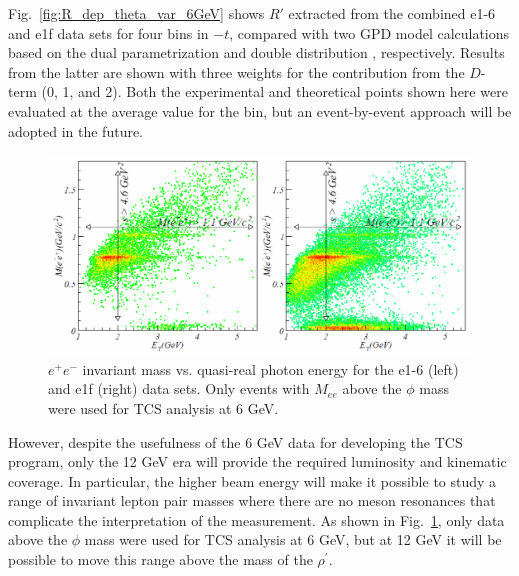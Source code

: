 Fig.~\ref{fig:R_dep_theta_var_6GeV} shows $R'$ extracted from the combined
e1-6 and e1f data sets for four bins in $-t$, compared with two GPD model
calculations based on the dual parametrization
\cite{Polyakov:2002wz,Guzey:2006xi,Guzey:2008ys,Polyakov:2008aa} and double
distribution \cite{Radyushkin:1998es}, respectively. Results from the latter
are shown with three weights for the contribution from the $D$-term (0, 1, and
2). Both the experimental and theoretical points shown here were evaluated at
the average value for the bin, but an event-by-event approach will be adopted
in the future.

\begin{figure}[t]
\includegraphics[scale=0.45]{TCS407.eps}
\caption{\small{$e^+e^-$ invariant mass vs. quasi-real photon energy for the
e1-6 (left) and e1f (right) data sets. Only events with $M_{ee}$ above the
$\phi$ mass were used for TCS analysis at 6 GeV.}}
\label{fig:TCS6}
\end{figure}

However, despite the usefulness of the 6 GeV data for developing the TCS
program, only the 12 GeV era will provide the required luminosity and
kinematic coverage. In particular, the higher beam energy will make it
possible to study a range of invariant lepton pair masses where there are no
meson resonances that complicate the interpretation of the measurement. As
shown in Fig.~\ref{fig:TCS6}, only data above the $\phi$ mass were used for
TCS analysis at 6 GeV, but at 12 GeV it will be possible to move this range
above the mass of the $\rho^{\prime}$.
